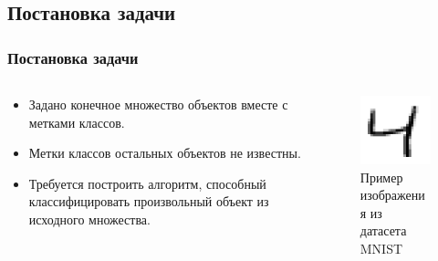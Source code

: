 \documentclass{beamer}
\begin{document}
		\subsection{Постановка задачи}
		\begin{frame}
			\frametitle{Постановка задачи}
			\begin{columns}[] %
				\begin{column}{.5\textwidth}
				\begin{itemize}
					\item Задано конечное множество объектов вместе с метками классов. 
					\item Метки классов остальных объектов не известны. 
					\item Требуется построить алгоритм, способный классифицировать произвольный объект из исходного множества.
				\end{itemize}
				\end{column}%
			\hfill%
				\begin{column}{.49\textwidth}
					\begin{figure}
						\centering
						\includegraphics[width=0.6\linewidth]{mnist_example.png}
						\caption{Пример изображения из датасета MNIST}
					\end{figure}
				\end{column}%
			\end{columns}
		\end{frame}
	
\end{document}
